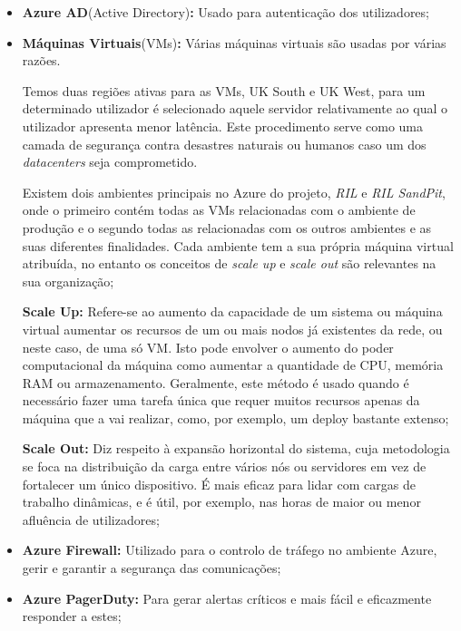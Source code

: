         \begin{itemize}
            \item \textbf{Azure AD}(Active Directory)\textbf{:} Usado para autenticação dos utilizadores;
            \item \textbf{Máquinas Virtuais}(VMs)\textbf{:} Várias máquinas virtuais são usadas por várias razões.
            
            Temos duas regiões ativas para as VMs, UK South e UK West, para um determinado utilizador é selecionado aquele servidor relativamente ao qual o utilizador apresenta menor latência. Este procedimento serve como uma camada de segurança contra desastres naturais ou humanos caso um dos \textit{datacenters} seja comprometido.
            
            Existem dois ambientes principais no Azure do projeto, \textit{RIL} e \textit{RIL SandPit}, onde o primeiro contém todas as VMs relacionadas com o ambiente de produção e o segundo todas as relacionadas com os outros ambientes e as suas diferentes finalidades. Cada ambiente tem a sua própria máquina virtual atribuída, no entanto os conceitos de \textit{scale up} e \textit{scale out} são relevantes na sua organização;

            \textbf{Scale Up:} Refere-se ao aumento da capacidade de um sistema ou máquina virtual aumentar os recursos de um ou mais nodos já existentes da rede, ou neste caso, de uma só VM. Isto pode envolver o aumento do poder computacional da máquina como aumentar a quantidade de CPU, memória RAM ou armazenamento. Geralmente, este método é usado quando é necessário fazer uma tarefa única que requer muitos recursos apenas da máquina que a vai realizar, como, por exemplo, um deploy bastante extenso;

            \textbf{Scale Out:} Diz respeito à expansão horizontal do sistema, cuja metodologia se foca na distribuição da carga entre vários nós ou servidores em vez de fortalecer um único dispositivo. É mais eficaz para lidar com cargas de trabalho dinâmicas, e é útil, por exemplo, nas horas de maior ou menor afluência de utilizadores\cite{scale-up-scale-out};

            \item \textbf{Azure Firewall:} Utilizado para o controlo de tráfego no ambiente Azure, gerir e garantir a segurança das comunicações;

            \item \textbf{Azure PagerDuty:} Para gerar alertas críticos e mais fácil e eficazmente responder a estes;
            

\end{itemize}
